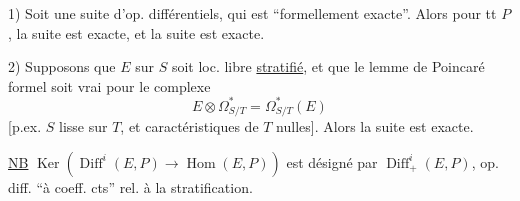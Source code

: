 
1) Soit
une suite d'op. différentiels, qui est ``formellement exacte''. Alors pour tt $P$, la suite
est exacte, et la suite
est exacte.

2) Supposons que $E$ sur $S$ soit loc. libre \uline{stratifié}, et que le lemme de Poincaré formel soit vrai pour le complexe
\[
E\otimes\Omega^*_{S/T}=\Omega^*_{S/T}(E)
\]
[p.ex. $S$ lisse sur $T$, et caractéristiques de $T$ nulles].
Alors  la suite
est exacte.

\uline{NB} $\operatorname{Ker}(\operatorname{Diff}^i(E,P)\to\operatorname{Hom}(E,P))$ est désigné par
$\operatorname{Diff}^i_+(E,P)$, op. diff. ``à coeff. cts'' rel. à la stratification.
